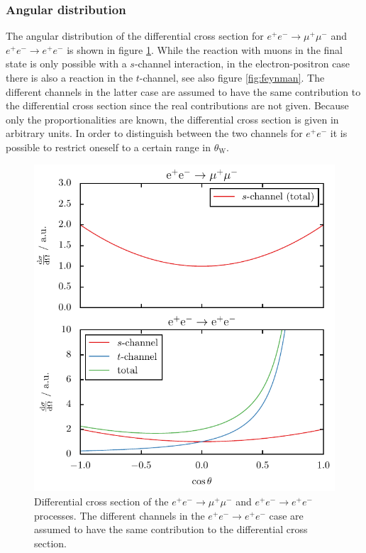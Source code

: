 \documentclass[11pt, a4paper]{article}
\numberwithin{equation}{section}
\begin{document}
\subsubsection{Angular distribution}
The angular distribution of the differential cross section for  $e^+e^-\rightarrow \mu^+\mu^-$ and $e^+e^-\rightarrow e^+e^-$ is shown in figure \ref{fig:channels}.
While the reaction with muons in the final state is only possible with a $s$-channel interaction, in the electron-positron case there is also a reaction in the $t$-channel, see also figure \ref{fig:feynman}.
The different channels in the latter case are assumed to have the same contribution to the differential cross section since the real contributions are not given.
Because only the proportionalities are known, the differential cross section is given in arbitrary units.
In order to distinguish between the two channels for $e^+e^-$ it is possible to restrict oneself to a certain range in $\theta_\mathrm{W}$.
\begin{figure}[h]
	\centering
	\includegraphics{./figures/s_t_channel.pdf}
	\caption{Differential cross section of the $e^+e^-\rightarrow \mu^+\mu^-$ and $e^+e^-\rightarrow e^+e^-$ processes. The different channels in the  $e^+e^-\rightarrow e^+e^-$ case are assumed to have the same contribution to the differential cross section.}
	\label{fig:channels}
\end{figure}
\end{document}
